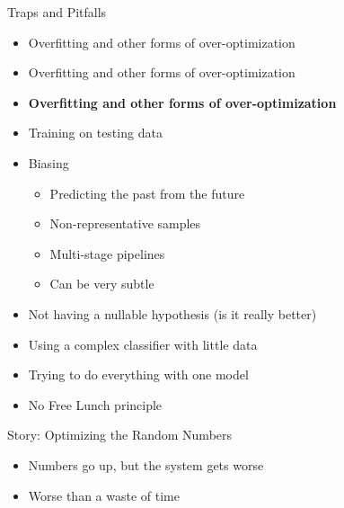 \documentclass{beamer}
\begin{document}
\begin{frame}{Traps and Pitfalls}

  \begin{itemize}
  \item Overfitting and other forms of over-optimization \pause 
  \item \alert{Overfitting and other forms of over-optimization} \pause
  \item \alert{\bf Overfitting and other forms of over-optimization} \pause
  \item Training on testing data
  \item Biasing
    \begin{itemize}
    \item Predicting the past from the future
    \item Non-representative samples
    \item Multi-stage pipelines
    \item Can be very subtle
    \end{itemize}
  \item Not having a nullable hypothesis (is it really better)
  \item Using a complex classifier with little data
  \item Trying to do everything with one model
  \item \alert{No Free Lunch} principle
  \end{itemize}
  
\end{frame}


\begin{frame}{Story: Optimizing the Random Numbers}
  \begin{center}
   \pause
  \end{center}

  \begin{itemize}
    \item Numbers go up, but the system \alert{gets worse}
    \item Worse than a waste of time
  \end{itemize}
\end{frame}

\end{document}
